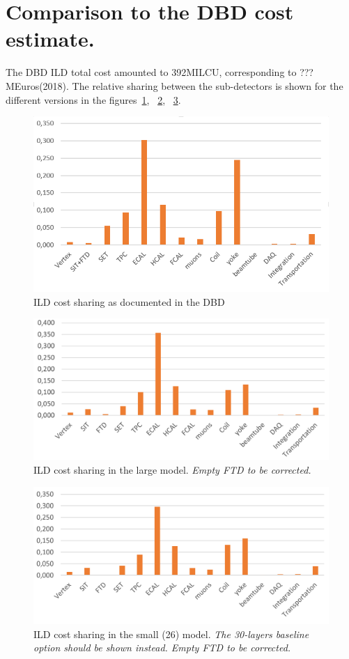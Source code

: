 \section{Comparison to the DBD cost estimate.}
 The DBD ILD total cost amounted to 392MILCU, corresponding to ??? MEuros(2018). The relative sharing between the sub-detectors is shown for the different versions in the figures~\ref{fig:det:DBD_cost_sharing}, ~\ref{Costing:Large_cost_sharing}, ~\ref{Costing:Small_cost_sharing}. 
 
\begin{figure}[h!]
\centering
\includegraphics[width=0.8\hsize]{Detector/fig/DBD_cost_sharing.PNG}
\caption{ILD cost sharing as documented in the DBD}
\label{fig:det:DBD_cost_sharing}
\end{figure}

\begin{figure}[h!]
\centering
\includegraphics[width=0.8\hsize]{Costing/Large_cost_sharing.PNG}
\caption{ILD cost sharing in the large model. \textit{Empty FTD to be corrected.}}
\label{Costing:Large_cost_sharing}
\end{figure}

\begin{figure}[h!]
\centering
\includegraphics[width=0.8\hsize]{Costing/Small_cost_sharing.PNG}
\caption{ILD cost sharing in the small (26) model. \textit{The 30-layers baseline option should be shown instead. Empty FTD to be corrected.}}
\label{Costing:Small_cost_sharing}
\end{figure}

